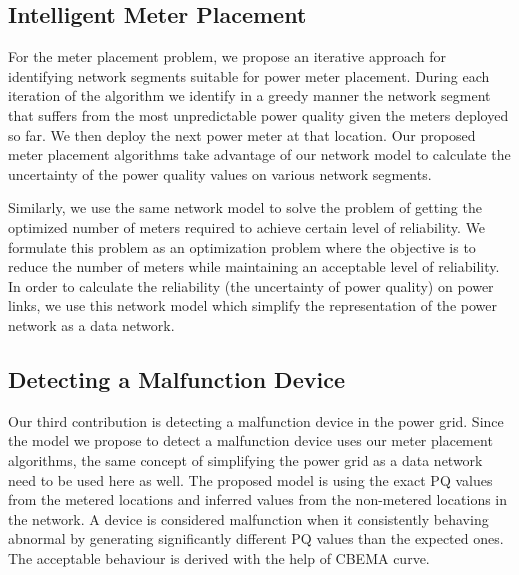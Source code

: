 \subsection{Intelligent Meter Placement}
For the meter placement problem, we propose an iterative approach for identifying network segments suitable for power meter placement. During each iteration of the algorithm we identify in a greedy manner the network segment that suffers from the most unpredictable power quality given the meters deployed so far. We then deploy the next power meter at that location. Our proposed meter placement algorithms take advantage of our network model to calculate the uncertainty of the power quality values on various network segments.

Similarly, we use the same network model to solve the problem of getting the optimized number of meters required to achieve certain level of reliability. We formulate this problem as an optimization problem where the objective is to reduce the number of meters while maintaining an acceptable level of reliability. In order to calculate the reliability (the uncertainty of power quality) on power links, we use this network model which simplify the representation of the power network as a data network.


\subsection{Detecting a Malfunction Device}
Our third contribution is detecting a malfunction device in the power grid. Since the model we propose to detect a malfunction device uses our meter placement algorithms, the same concept of simplifying the power grid as a data network need to be used here as well. The proposed model is using the exact PQ values from the metered locations and inferred values from the non-metered locations in the network. A device is considered malfunction when it consistently behaving abnormal by generating significantly different PQ values than the expected ones. The acceptable behaviour is derived with the help of CBEMA curve.